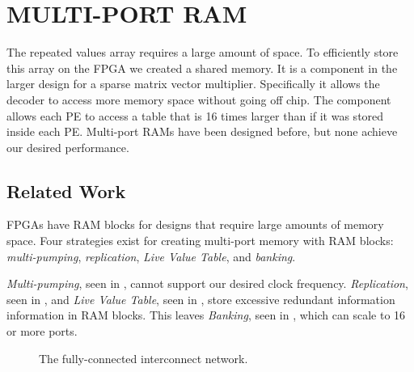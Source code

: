 \chapter{MULTI-PORT RAM}
\label{chp:memory}
The repeated values array requires a large amount of space. To efficiently store this array on the FPGA we created a shared memory. It is a component in the larger design for a sparse matrix vector multiplier. Specifically it allows the decoder to access more memory space without going off chip. The component allows each PE to access a table that is 16 times larger than if it was stored inside each PE. Multi-port RAMs have been designed before, but none achieve our desired performance.

\section{Related Work}
\label{sec:relatedwork}
FPGAs have RAM blocks for designs that require large amounts of memory space. Four strategies exist for creating multi-port memory with RAM blocks: {\em multi-pumping}, {\em replication}, {\em Live Value Table}, and {\em banking}. \par
{\em Multi-pumping}, seen in \cite{prelim:manjikian,prelim:canis,prelim:yantir}, cannot support our desired clock frequency. {\em Replication}, seen in \cite{prelim:fort,prelim:mousali,prelim:yiannacouras}, and {\em Live Value Table}, seen in \cite{prelim:laforest,prelim:anjam,prelim:abdelhadi}, store excessive redundant information information in RAM blocks. This leaves {\em Banking}, seen in \cite{prelim:moscola,prelim:saghir,prelim:saghir2}, which can scale to 16 or more ports.\par

    \begin{figure}
        \center
        \caption{The fully-connected interconnect network.}
        \label{fig:crossbar}
    \end{figure}

